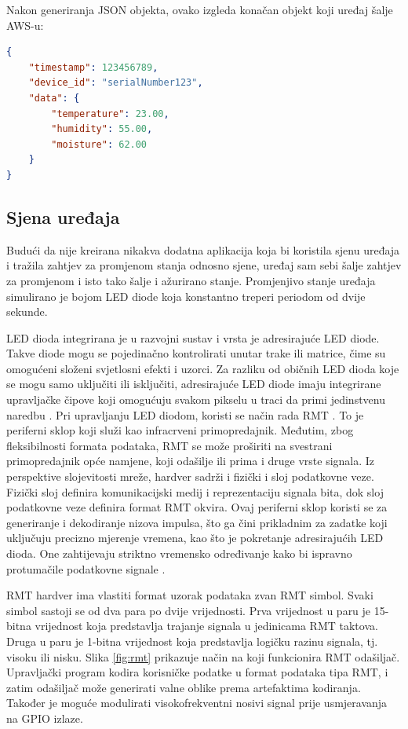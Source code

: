 Nakon generiranja JSON objekta, ovako izgleda konačan objekt koji uređaj šalje AWS-u:

\begin{lstlisting}[caption={JSON objekt za slanje na platformu}, language=json]
{
	"timestamp": 123456789,
	"device_id": "serialNumber123",
	"data": {
		"temperature": 23.00,
		"humidity": 55.00,
		"moisture": 62.00
	}
}
\end{lstlisting}

\subsection{Sjena uređaja}

Budući da nije kreirana nikakva dodatna aplikacija koja bi koristila sjenu uređaja i tražila zahtjev za promjenom stanja odnosno sjene, uređaj sam sebi šalje zahtjev za promjenom i isto tako šalje i ažurirano stanje. Promjenjivo stanje uređaja simulirano je bojom LED diode koja konstantno treperi periodom od dvije sekunde.  

LED dioda integrirana je u razvojni sustav i vrsta je adresirajuće LED diode. Takve diode mogu se pojedinačno kontrolirati unutar trake ili matrice, čime su omogućeni složeni svjetlosni efekti i uzorci. Za razliku od običnih LED dioda koje se mogu samo uključiti ili isključiti, adresirajuće LED diode imaju integrirane upravljačke čipove koji omogućuju svakom pikselu u traci da primi jedinstvenu naredbu \cite{led}. Pri upravljanju LED diodom, koristi se način rada RMT . To je periferni sklop koji služi kao infracrveni primopredajnik. Međutim, zbog fleksibilnosti formata podataka, RMT se može proširiti na svestrani primopredajnik opće namjene, koji odašilje ili prima i druge vrste signala. Iz perspektive slojevitosti mreže, hardver sadrži i fizički i sloj podatkovne veze. Fizički sloj definira komunikacijski medij i reprezentaciju signala bita, dok sloj podatkovne veze definira format RMT okvira. Ovaj periferni sklop koristi se za generiranje i dekodiranje nizova impulsa, što ga čini prikladnim za zadatke koji uključuju precizno mjerenje vremena, kao što je pokretanje adresirajućih LED dioda. One zahtijevaju striktno vremensko određivanje kako bi ispravno protumačile podatkovne signale \cite{espressif}. 

RMT hardver ima vlastiti format uzorak podataka zvan RMT simbol. Svaki simbol sastoji se od dva para po dvije vrijednosti. Prva vrijednost u paru je 15-bitna vrijednost koja predstavlja trajanje signala u jedinicama RMT taktova. Druga u paru je 1-bitna vrijednost koja predstavlja logičku razinu signala, tj. visoku ili nisku. Slika \ref{fig:rmt} prikazuje način na koji funkcionira RMT odašiljač. Upravljački program kodira korisničke podatke u format podataka tipa RMT, i zatim odašiljač može generirati valne oblike prema artefaktima kodiranja. Također je moguće modulirati visokofrekventni nosivi signal prije usmjeravanja na GPIO izlaze.

